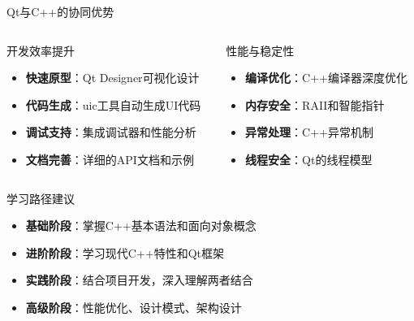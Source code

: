 \documentclass[UTF8,aspectratio=169]{beamer}
\begin{document}
\begin{frame}{Qt与C++的协同优势}
    \begin{columns}
        \begin{column}{0.48\textwidth}
            \begin{ytublock}{开发效率提升}
                \begin{itemize}
                    \item \textbf{快速原型}：Qt Designer可视化设计
                    \item \textbf{代码生成}：uic工具自动生成UI代码
                    \item \textbf{调试支持}：集成调试器和性能分析
                    \item \textbf{文档完善}：详细的API文档和示例
                \end{itemize}
            \end{ytublock}
        \end{column}
        \begin{column}{0.48\textwidth}
            \begin{ytublock}{性能与稳定性}
                \begin{itemize}
                    \item \textbf{编译优化}：C++编译器深度优化
                    \item \textbf{内存安全}：RAII和智能指针
                    \item \textbf{异常处理}：C++异常机制
                    \item \textbf{线程安全}：Qt的线程模型
                \end{itemize}
            \end{ytublock}
        \end{column}
    \end{columns}

    \begin{ytublock}{学习路径建议}
        \begin{itemize}
            \item \textbf{基础阶段}：掌握C++基本语法和面向对象概念
            \item \textbf{进阶阶段}：学习现代C++特性和Qt框架
            \item \textbf{实践阶段}：结合项目开发，深入理解两者结合
            \item \textbf{高级阶段}：性能优化、设计模式、架构设计
        \end{itemize}
    \end{ytublock}
\end{frame}
\end{document}
